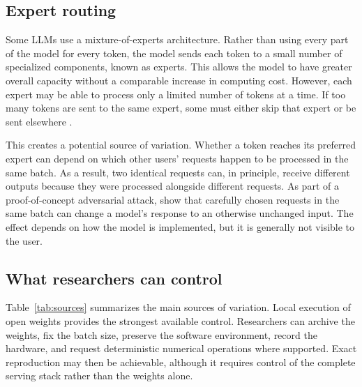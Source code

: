 \documentclass[11pt]{article}
\begin{document}
\subsection{Expert routing}

Some LLMs use a mixture-of-experts architecture. Rather than using every part of the model for every token, the model sends each token to a small number of specialized components, known as experts. This allows the model to have greater overall capacity without a comparable increase in computing cost. However, each expert may be able to process only a limited number of tokens at a time. If too many tokens are sent to the same expert, some must either skip that expert or be sent elsewhere \citep{fedus2022switch}.\medskip

This creates a potential source of variation. Whether a token reaches its preferred expert can depend on which other users' requests happen to be processed in the same batch. As a result, two identical requests can, in principle, receive different outputs because they were processed alongside different requests. As part of a proof-of-concept adversarial attack, \citet{hayes2024} show that carefully chosen requests in the same batch can change a model's response to an otherwise unchanged input. The effect depends on how the model is implemented, but it is generally not visible to the user.\medskip

\subsection{What researchers can control}

Table~\ref{tab:sources} summarizes the main sources of variation. Local execution of open weights provides the strongest available control. Researchers can archive the weights, fix the batch size, preserve the software environment, record the hardware, and request deterministic numerical operations where supported. Exact reproduction may then be achievable, although it requires control of the complete serving stack rather than the weights alone. \medskip
\end{document}
